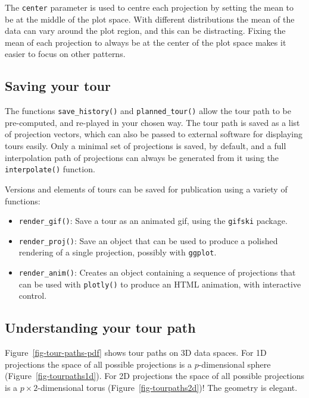 \documentclass[
  letterpaper,
]{krantz}
\providecommand{\tightlist}{%
  \setlength{\itemsep}{0pt}\setlength{\parskip}{0pt}}\usepackage{longtable,booktabs,array}
\begin{document}
The \texttt{center} parameter is used to centre each projection by
setting the mean to be at the middle of the plot space. With different
distributions the mean of the data can vary around the plot region, and
this can be distracting. Fixing the mean of each projection to always be
at the center of the plot space makes it easier to focus on other
patterns.

\subsection{Saving your tour}\label{saving-your-tour}

The functions \texttt{save\_history()} and \texttt{planned\_tour()}
allow the tour path to be pre-computed, and re-played in your chosen
way. The tour path is saved as a list of projection vectors, which can
also be passed to external software for displaying tours easily. Only a
minimal set of projections is saved, by default, and a full
interpolation path of projections can always be generated from it using
the \texttt{interpolate()} function.

Versions and elements of tours can be saved for publication using a
variety of functions:

\begin{itemize}
\tightlist
\item
  \texttt{render\_gif()}: Save a tour as an animated gif, using the
  \texttt{gifski} package.
\item
  \texttt{render\_proj()}: Save an object that can be used to produce a
  polished rendering of a single projection, possibly with
  \texttt{ggplot}.
\item
  \texttt{render\_anim()}: Creates an object containing a sequence of
  projections that can be used with \texttt{plotly()} to produce an HTML
  animation, with interactive control.
\end{itemize}

\subsection{Understanding your tour
path}\label{understanding-your-tour-path}

Figure~\ref{fig-tour-paths-pdf} shows tour paths on 3D data spaces. For
1D projections the space of all possible projections is a
\(p\)-dimensional sphere (Figure~\ref{fig-tourpaths1d}). For 2D
projections the space of all possible projections is a
\(p\times 2\)-dimensional torus (Figure~\ref{fig-tourpaths2d})! The
geometry is elegant.
\end{document}
